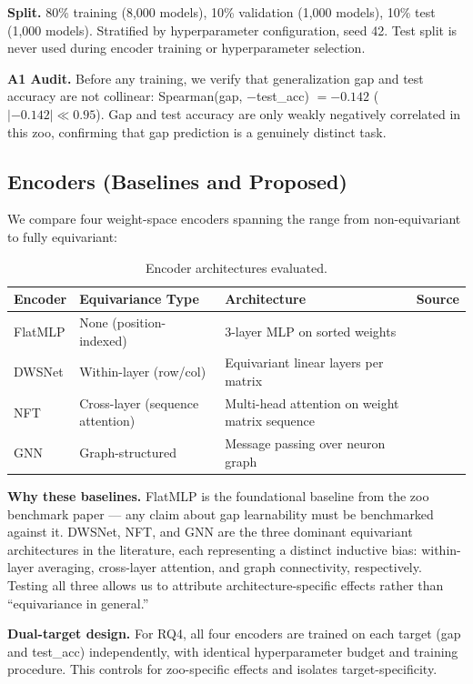 \textbf{Split.} 80\% training (8,000 models), 10\% validation (1,000 models), 10\% test (1,000 models).
Stratified by hyperparameter configuration, seed 42. Test split is never used during encoder training
or hyperparameter selection.

\textbf{A1 Audit.} Before any training, we verify that generalization gap and test accuracy are not collinear:
Spearman(gap, $-$test\_acc) $= -0.142$ ($|-0.142| \ll 0.95$). Gap and test accuracy are only weakly negatively
correlated in this zoo, confirming that gap prediction is a genuinely distinct task.

\subsection{Encoders (Baselines and Proposed)}

We compare four weight-space encoders spanning the range from non-equivariant to fully equivariant:

\begin{table}[h]
\centering
\caption{Encoder architectures evaluated.}
\label{tab:encoders}
\begin{tabular}{@{}llll@{}}
\toprule
Encoder & Equivariance Type & Architecture & Source \\
\midrule
FlatMLP & None (position-indexed) & 3-layer MLP on sorted weights & \citet{unterthiner2020} \\
DWSNet & Within-layer (row/col) & Equivariant linear layers per matrix & \citet{navon2023} \\
NFT & Cross-layer (sequence attention) & Multi-head attention on weight matrix sequence & \citet{zhou2023} \\
GNN & Graph-structured & Message passing over neuron graph & \citet{kofinas2024} \\
\bottomrule
\end{tabular}
\end{table}

\textbf{Why these baselines.} FlatMLP is the foundational baseline from the zoo benchmark paper --- any claim
about gap learnability must be benchmarked against it. DWSNet, NFT, and GNN are the three dominant
equivariant architectures in the literature, each representing a distinct inductive bias: within-layer
averaging, cross-layer attention, and graph connectivity, respectively. Testing all three allows us to
attribute architecture-specific effects rather than ``equivariance in general.''

\textbf{Dual-target design.} For RQ4, all four encoders are trained on each target (gap and test\_acc)
independently, with identical hyperparameter budget and training procedure. This controls for
zoo-specific effects and isolates target-specificity.

